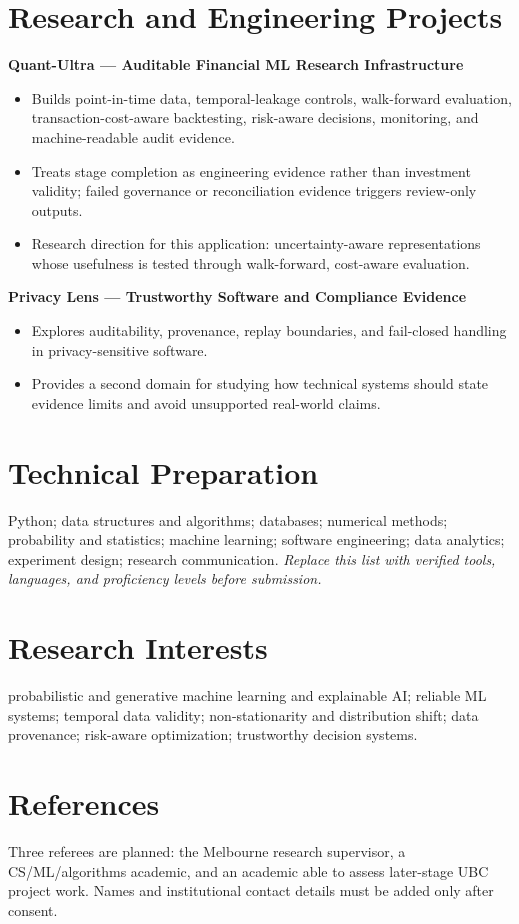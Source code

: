 \documentclass[11pt]{article}
\begin{document}
\section*{Research and Engineering Projects}
\textbf{Quant-Ultra --- Auditable Financial ML Research Infrastructure}
\begin{itemize}
\item Builds point-in-time data, temporal-leakage controls, walk-forward evaluation, transaction-cost-aware backtesting, risk-aware decisions, monitoring, and machine-readable audit evidence.
\item Treats stage completion as engineering evidence rather than investment validity; failed governance or reconciliation evidence triggers review-only outputs.
\item Research direction for this application: uncertainty-aware representations whose usefulness is tested through walk-forward, cost-aware evaluation.
\end{itemize}

\begin{samepage}
\textbf{Privacy Lens --- Trustworthy Software and Compliance Evidence}
\begin{itemize}
\item Explores auditability, provenance, replay boundaries, and fail-closed handling in privacy-sensitive software.
\item Provides a second domain for studying how technical systems should state evidence limits and avoid unsupported real-world claims.
\end{itemize}
\end{samepage}

\section*{Technical Preparation}
Python; data structures and algorithms; databases; numerical methods; probability and statistics; machine learning; software engineering; data analytics; experiment design; research communication. \textit{Replace this list with verified tools, languages, and proficiency levels before submission.}

\section*{Research Interests}
probabilistic and generative machine learning and explainable AI; reliable ML systems; temporal data validity; non-stationarity and distribution shift; data provenance; risk-aware optimization; trustworthy decision systems.

\section*{References}
Three referees are planned: the Melbourne research supervisor, a CS/ML/algorithms academic, and an academic able to assess later-stage UBC project work. Names and institutional contact details must be added only after consent.
\end{document}
